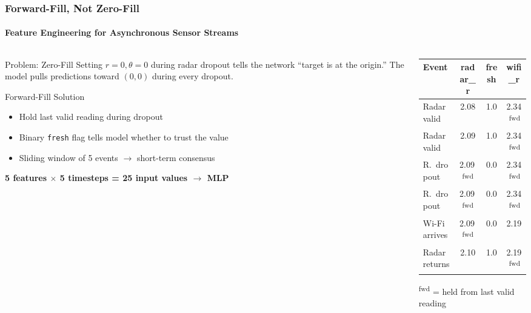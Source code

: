 \documentclass[
	11pt,
	aspectratio=169,
]{beamer}
\begin{document}
\begin{frame}
	\frametitle{Forward-Fill, Not Zero-Fill}
	\framesubtitle{Feature Engineering for Asynchronous Sensor Streams}

	\begin{columns}[c]
		\begin{column}{0.48\textwidth}
			\scriptsize
			\begin{alertblock}{Problem: Zero-Fill}
				Setting $r{=}0, \theta{=}0$ during radar dropout tells the network ``target is at the origin.'' The model \alert{pulls predictions toward $(0,0)$} during every dropout.
			\end{alertblock}

			\begin{exampleblock}{Forward-Fill Solution}
				\begin{itemize}
					\item Hold last valid reading during dropout
					\item Binary \texttt{fresh} flag tells model whether to trust the value
					\item Sliding window of 5 events $\to$ short-term consensus
				\end{itemize}
			\end{exampleblock}

			\medskip
			\textbf{5 features $\times$ 5 timesteps = 25 input values $\to$ MLP}
		\end{column}

		\begin{column}{0.48\textwidth}
			\centering
			\scriptsize
			\begin{tabular}{l c c c}
				\toprule
				\textbf{Event} & \textbf{radar\_r} & \textbf{fresh} & \textbf{wifi\_r} \\
				\midrule
				Radar valid & 2.08 & \alert{1.0} & 2.34\,\textsuperscript{fwd} \\
				Radar valid & 2.09 & \alert{1.0} & 2.34\,\textsuperscript{fwd} \\
				R.\ dropout & 2.09\,\textsuperscript{fwd} & \alert{0.0} & 2.34\,\textsuperscript{fwd} \\
				R.\ dropout & 2.09\,\textsuperscript{fwd} & \alert{0.0} & 2.34\,\textsuperscript{fwd} \\
				Wi-Fi arrives & 2.09\,\textsuperscript{fwd} & 0.0 & \alert{2.19} \\
				Radar returns & \alert{2.10} & \alert{1.0} & 2.19\,\textsuperscript{fwd} \\
				\bottomrule
			\end{tabular}
			\smallskip

			\tiny \textsuperscript{fwd} = held from last valid reading
		\end{column}
	\end{columns}
\end{frame}
\end{document}
